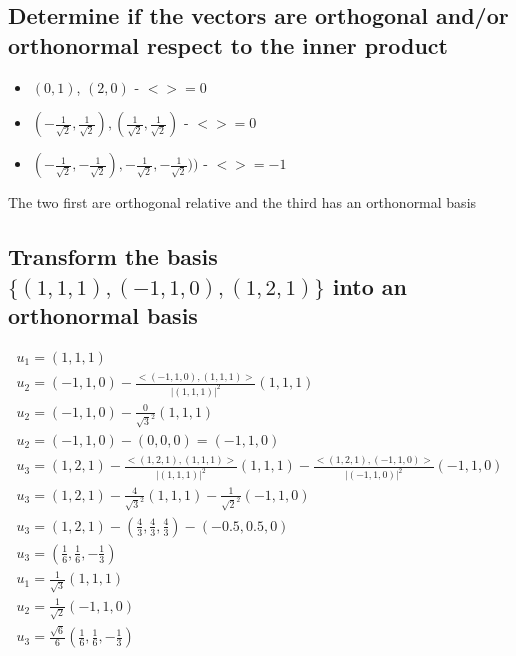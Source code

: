 \documentclass[12pt, a4paper]{article}
\begin{document}
		\subsection{Determine if the vectors are orthogonal and/or orthonormal respect to the inner product}
			\begin{itemize}
				\item $(0,1)$, $(2,0)$ - $<>=0$
				\item $(-\frac{1}{\sqrt{2}},\frac{1}{\sqrt{2}}),  (\frac{1}{\sqrt{2}},\frac{1}{\sqrt{2}})$  - $<>=0$
				\item $(-\frac{1}{\sqrt{2}},-\frac{1}{\sqrt{2}}),-\frac{1}{\sqrt{2}},-\frac{1}{\sqrt{2}}))$ - $<>=-1$
			\end{itemize}
			The two first are orthogonal relative and the third has an orthonormal basis
		\subsection{Transform the basis $\{(1,1,1),(-1,1,0),(1,2,1)\}$ into an orthonormal basis}
			\begin{align*}
				u_1=(1,1,1)\\
				u_2=(-1,1,0)-\frac{<(-1,1,0),(1,1,1)>}{|(1,1,1)|^2}(1,1,1)\\
				u_2=(-1,1,0)-\frac{0}{\sqrt{3}^2}(1,1,1)\\
				u_2=(-1,1,0)-(0,0,0)=(-1,1,0)\\
				u_3=(1,2,1)-\frac{<(1,2,1),(1,1,1)>}{|(1,1,1)|^2}(1,1,1)-\frac{<(1,2,1),(-1,1,0)>}{|(-1,1,0)|^2}(-1,1,0)\\
				u_3=(1,2,1)-\frac{4}{\sqrt{3}^2}(1,1,1)-\frac{1}{\sqrt{2}^2}(-1,1,0)\\
				u_3=(1,2,1)-(\frac{4}{3},\frac{4}{3},\frac{4}{3})-(-0.5,0.5,0)\\
				u_3=(\frac{1}{6},\frac{1}{6},-\frac{1}{3})\\
				u_1=\frac{1}{\sqrt{3}}(1,1,1)\\
				u_2=\frac{1}{\sqrt{2}}(-1,1,0)\\
				u_3=\frac{\sqrt{6}}{6}(\frac{1}{6},\frac{1}{6},-\frac{1}{3})
			\end{align*}
\end{document}
